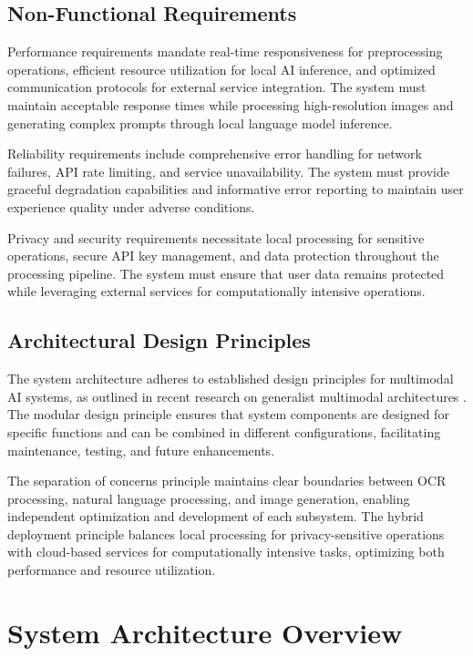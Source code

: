 \subsection{Non-Functional Requirements}

Performance requirements mandate real-time responsiveness for preprocessing operations, efficient resource utilization for local AI inference, and optimized communication protocols for external service integration. The system must maintain acceptable response times while processing high-resolution images and generating complex prompts through local language model inference.

Reliability requirements include comprehensive error handling for network failures, API rate limiting, and service unavailability. The system must provide graceful degradation capabilities and informative error reporting to maintain user experience quality under adverse conditions.

Privacy and security requirements necessitate local processing for sensitive operations, secure API key management, and data protection throughout the processing pipeline. The system must ensure that user data remains protected while leveraging external services for computationally intensive operations.

\subsection{Architectural Design Principles}

The system architecture adheres to established design principles for multimodal AI systems, as outlined in recent research on generalist multimodal architectures \cite{li2024generalist}. The modular design principle ensures that system components are designed for specific functions and can be combined in different configurations, facilitating maintenance, testing, and future enhancements.

The separation of concerns principle maintains clear boundaries between OCR processing, natural language processing, and image generation, enabling independent optimization and development of each subsystem. The hybrid deployment principle balances local processing for privacy-sensitive operations with cloud-based services for computationally intensive tasks, optimizing both performance and resource utilization.

\section{System Architecture Overview}

